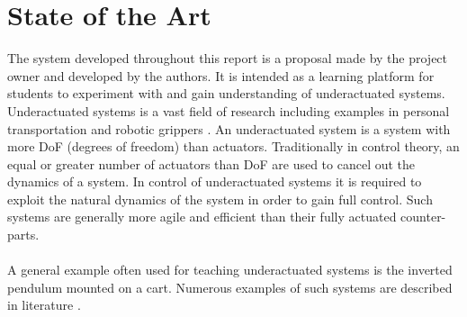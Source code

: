 \section{State of the Art}
The system developed throughout this report is a proposal made by the project owner and developed by the authors.
It is intended as a learning platform for students to experiment with and gain understanding of underactuated systems.
Underactuated systems is a vast field of research including examples in personal transportation \cite{scooter} \cite{segway} and robotic grippers \cite{threegripper} \cite{softgripper}.
An underactuated system is a system with more DoF (degrees of freedom) than actuators.
Traditionally in control theory, an equal or greater number of actuators than DoF are used to cancel out the dynamics of a system.
In control of underactuated systems it is required to exploit the natural dynamics of the system \cite{mitunderactuated} in order to gain full control.
Such systems are generally more agile and efficient than their fully actuated counter-parts.
\\~\\
A general example often used for teaching underactuated systems is the inverted pendulum mounted on a cart.
Numerous examples of such systems are described in literature \cite{invertpendulum1} \cite{tripleinvertpendulum} \cite{invertpendulum3} \cite{doubleinvertpendulum}.

